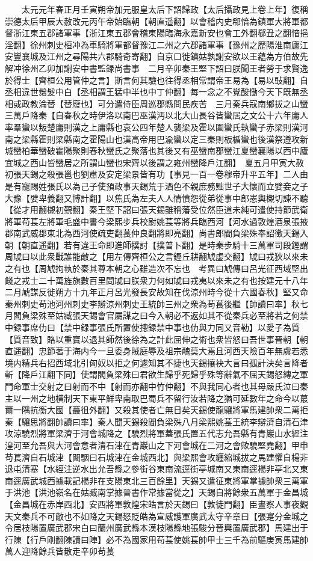 　　太元元年春正月壬寅朔帝加元服皇太后下詔歸政【太后攝政見上卷上年】復稱崇德太后甲辰大赦改元丙午帝始臨朝【朝直遥翻】以會稽内史郗愔為鎮軍大將軍都督浙江東五郡諸軍事【浙江東五郡會稽東陽臨海永嘉新安也會工外翻郗丑之翻愔挹淫翻】徐州刺史桓冲為車騎將軍都督豫江二州之六郡諸軍事【豫州之歷陽淮南廬江安豐襄城及江州之尋陽共六郡騎奇寄翻】自京口徙鎮姑孰謝安欲以王藴為方伯故先解冲徐州乙卯加謝安中書監録尚書事　二月辛卯秦王堅下詔曰朕聞王者勞于求賢逸於得士【齊桓公用管仲之言】斯言何其驗也往得丞相常謂帝王易為【易以䜴翻】自丞相違世鬚髮中白【丞相謂王猛中半也中丁仲翻】每一念之不覺酸慟今天下既無丞相或政教淪替【替廢也】可分遣侍臣周巡郡縣問民疾苦　三月秦兵寇南鄉拔之山蠻三萬戶降秦【自春秋之時伊洛以南巴巫漢沔以北大山長谷皆蠻居之文公十六年庸人率羣蠻以叛楚庸則漢之上庸縣也哀公四年楚人襲梁及霍以圍蠻氏執蠻子赤梁則漢河南之梁縣霍則梁縣南之霍陽山也漢高帝用巴渝蠻以定三秦則板楯蠻也後漢祭遵攻新城蠻柏華蠻破霍陽聚則春秋蠻氏之聚落也其後又有巫蠻南郡蠻江夏蠻襄陽以西中廬宜城之西山皆蠻居之所謂山蠻也宋齊以後謂之雍州蠻降戶江翻】　夏五月甲寅大赦初張天錫之殺張邕也劉肅及安定梁景皆有功【事見一百一卷穆帝升平五年】二人由是有寵賜姓張氏以為己子使預政事天錫荒于酒色不親庶務黜世子大懷而立嬖妾之子大豫【嬖卑義翻又博計翻】以焦氏為左夫人人情憤怨從弟從事中郎憲輿櫬切諫不聽【從才用翻櫬初覲翻】秦王堅下詔曰張天錫雖稱藩受位然臣道未純可遣使持節武衛將軍苟萇左將軍毛盛中書今梁熙步兵校尉姚萇等將兵臨西河【河水過敦煌酒泉張掖郡南武威郡東北為西河使疏吏翻萇仲良翻將即亮翻】尚書郎閻負梁殊奉詔徵天錫入朝【朝直遥翻】若有違王命即進師撲討【撲普卜翻】是時秦步騎十三萬軍司段鏗謂周虓曰以此衆戰誰能敵之【用左傳齊桓公之言鏗丘耕翻虓虚交翻】虓曰戎狄以來未之有也【周虓拘執於秦其尊本朝之心雖造次不忘也　考異曰虓傳曰呂光征西域堅出餞之戎士二十萬旌旗數百里問虓曰朕衆力何如虓曰戎夷以來未之有也按建元十八年二月虓謀反徙朔方十九年正月呂光發長安故知在伐涼州時今從十六國春秋】堅又命秦州刺史苟池河州刺史李辯涼州刺史王統帥三州之衆為苟萇後繼【帥讀曰率】秋七月閻負梁殊至姑臧張天錫會官屬謀之曰今入朝必不返如其不從秦兵必至將若之何禁中録事席仂曰【禁中録事張氏所置使摠録禁中事也仂與力同又音勒】以愛子為質【質音致】賂以重寶以退其師然後徐為之計此屈伸之術也衆皆怒曰吾世事晉朝【朝直遥翻】忠節著于海内今一旦委身賊庭辱及祖宗醜莫大焉且河西天險百年無虞若悉境内精兵右招西域北引匈奴以拒之何遽知其不捷也天錫攘袂大言曰孤計決矣言降者斬【降戶江翻下同】使謂閻負梁殊曰君欲生歸乎死歸乎殊等辭氣不屈天錫怒縳之軍門命軍士交射之曰射而不中【射而亦翻中竹仲翻】不與我同心者也其母嚴氏泣曰秦主以一州之地横制天下東平鮮卑南取巴蜀兵不留行汝若降之猶可延數年之命今以蕞爾一隅抗衡大國【蕞徂外翻】又殺其使者亡無日矣天錫使龍驤將軍馬建帥衆二萬拒秦【驤思將翻帥讀曰率】秦人聞天錫殺閻負梁殊八月梁熙姚萇王統李辯濟自清石津攻涼驍烈將軍梁濟于河會城降之【驍烈將軍蓋張氏置五代志允吾縣有青巖山水經注湟河至允吾與大河會意者清石津在青巖山之下河會城在二河之會歟驍堅堯翻】甲申苟萇濟自石城津【闞駰曰石城津在金城西北】與梁熙會攻纒縮城拔之馬建懼自楊非退屯清塞【水經注逆水出允吾縣之參街谷東南流逕街亭城南又東南逕楊非亭北又東南逕廣武城西據載記楊非在支陽東北三百餘里】天錫又遣征東將軍掌據帥衆三萬軍于洪池【洪池嶺名在姑臧南掌據晉書作常據當從之】天錫自將餘衆五萬軍于金昌城【金昌城在赤岸西北】安西將軍敦煌宋皓言於天錫曰【敦徒門翻】臣晝察人事夜觀天文秦兵不可敵也不如降之天錫怒貶皓為宣威護軍廣武太守辛章曰【張寔分金城之令居枝陽置廣武郡宋白曰蘭州廣武縣本漢枝陽縣地張駿分晉興置廣武郡】馬建出于行陳【行戶剛翻陳讀曰陣】必不為國家用苟萇使姚萇帥甲士三千為前驅庚寅馬建帥萬人迎降餘兵皆散走辛卯苟萇